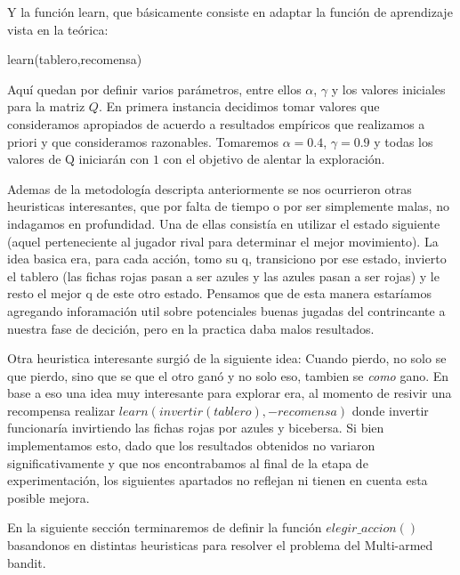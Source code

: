 Y la función learn, que básicamente consiste en adaptar la función de aprendizaje vista en la teórica:

\begin{algorithm}[h!]
\begin{algorithmic}[1]\parskip=1mm
 \caption{learn(tablero,recomensa)}
\end{algorithmic}
\end{algorithm}

Aquí quedan por definir varios parámetros, entre ellos $\alpha$, $\gamma$ y los valores iniciales para la matriz $Q$. En primera instancia decidimos tomar valores que consideramos apropiados de acuerdo a resultados empíricos que realizamos a priori y que consideramos razonables. Tomaremos $\alpha=0.4 $, $\gamma=0.9$ y todas los valores de Q iniciarán con $1$ con el objetivo de alentar la exploración.

Ademas de la metodología descripta anteriormente se nos ocurrieron otras heuristicas interesantes, que por falta de tiempo o por ser simplemente malas, no indagamos en profundidad. Una de ellas consistía en utilizar el estado siguiente (aquel perteneciente al jugador rival para determinar el mejor movimiento). La idea basica era, para cada acción, tomo su q, transiciono por ese estado, invierto el tablero (las fichas rojas pasan a ser azules y las azules pasan a ser rojas) y le resto el mejor q de este otro estado. Pensamos que de esta manera estaríamos agregando inforamación util sobre potenciales buenas jugadas del contrincante a nuestra fase de decición, pero en la practica daba malos resultados.

Otra heuristica interesante surgió de la siguiente idea: Cuando pierdo, no solo se que pierdo, sino que se que el otro ganó y no solo eso, tambien se \textit{como} gano. En base a eso una idea muy interesante para explorar era, al momento de resivir una recompensa realizar $learn(invertir(tablero), -recomensa)$ donde invertir funcionaría invirtiendo las fichas rojas por azules y bicebersa. Si bien implementamos esto, dado que los resultados obtenidos no variaron significativamente y que nos encontrabamos al final de la etapa de experimentación, los siguientes apartados no reflejan ni tienen en cuenta esta posible mejora.

En la siguiente sección terminaremos de definir la función $elegir\_accion()$ basandonos en distintas heuristicas para resolver el problema del Multi-armed bandit.

